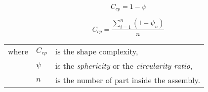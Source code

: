 \begin{equation}
C_{cp} = 1 - \psi
\label{eqn:EqShapeComplexityIndFinal}
\end{equation}

\begin{equation}
C_{cp} = \frac{ \sum_{i=1}^{n} (1-\psi_{n})}{n}
\label{eqn:EqShapeComplexityAvgFinal}
\end{equation}

\begin{tabular}{lll}
where		& $C_{cp}$ & is the shape complexity,\\ 
				& $\psi$ 	& is the \textit{sphericity} or the \textit{circularity ratio},\\
				& $n$		& is the number of part inside the assembly.\\
\end{tabular}



